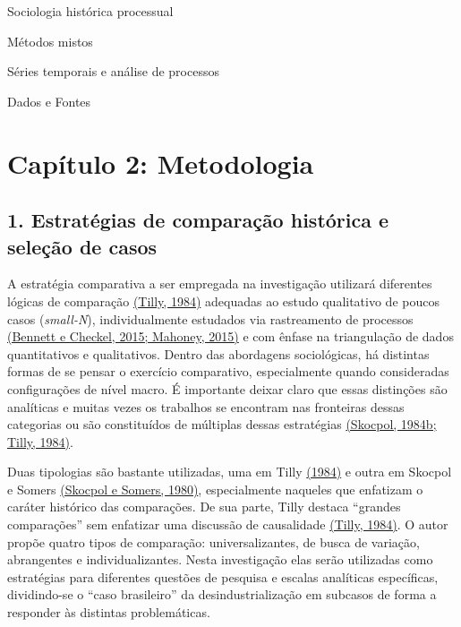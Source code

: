 Sociologia histórica processual

Métodos mistos

Séries temporais e análise de processos

Dados e Fontes

\section{\texorpdfstring{\textbf{Capítulo 2:
Metodologia}}{Capítulo 2: Metodologia}}\label{capuxedtulo-2-metodologia}

\subsection{\texorpdfstring{\textbf{1. Estratégias de comparação
histórica e seleção de
casos}}{1. Estratégias de comparação histórica e seleção de casos}}\label{estratuxe9gias-de-comparauxe7uxe3o-histuxf3rica-e-seleuxe7uxe3o-de-casos}

A estratégia comparativa a ser empregada na investigação utilizará
diferentes lógicas de comparação
\href{https://www.zotero.org/google-docs/?K2DQvI}{(Tilly, 1984)}
adequadas ao estudo qualitativo de poucos casos (\emph{small-N}),
individualmente estudados via rastreamento de processos
\href{https://www.zotero.org/google-docs/?rqZs4D}{(Bennett e Checkel,
2015; Mahoney, 2015)} e com ênfase na triangulação de dados
quantitativos e qualitativos. Dentro das abordagens sociológicas, há
distintas formas de se pensar o exercício comparativo, especialmente
quando consideradas configurações de nível macro. É importante deixar
claro que essas distinções são analíticas e muitas vezes os trabalhos se
encontram nas fronteiras dessas categorias ou são constituídos de
múltiplas dessas estratégias
\href{https://www.zotero.org/google-docs/?q2cH2R}{(Skocpol, 1984b;
Tilly, 1984)}.

Duas tipologias são bastante utilizadas, uma em Tilly
\href{https://www.zotero.org/google-docs/?F2hyh6}{(1984)} e outra em
Skocpol e Somers
\href{https://www.zotero.org/google-docs/?tJbF92}{(Skocpol e Somers,
1980)}, especialmente naqueles que enfatizam o caráter histórico das
comparações. De sua parte, Tilly destaca ``grandes comparações'' sem
enfatizar uma discussão de causalidade
\href{https://www.zotero.org/google-docs/?NffH2O}{(Tilly, 1984)}. O
autor propõe quatro tipos de comparação: universalizantes, de busca de
variação, abrangentes e individualizantes. Nesta investigação elas serão
utilizadas como estratégias para diferentes questões de pesquisa e
escalas analíticas específicas, dividindo-se o ``caso brasileiro'' da
desindustrialização em subcasos de forma a responder às distintas
problemáticas.

